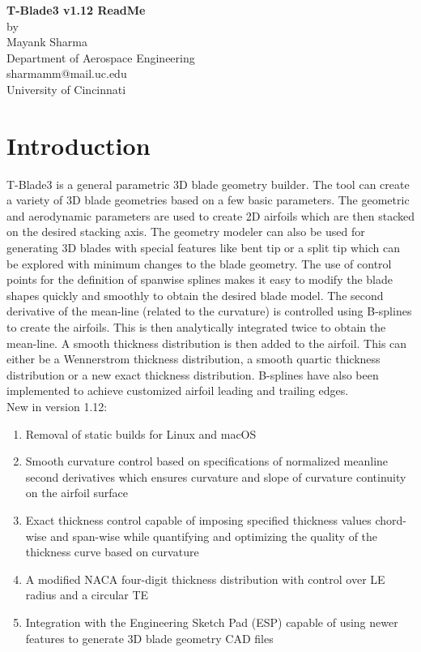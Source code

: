 \documentclass[8pt]{article}
\begin{document}
\begin{center}
\textbf{\large T-Blade3 v1.12 ReadMe}\\
by\\
Mayank Sharma\\
Department of Aerospace Engineering\\
sharmamm@mail.uc.edu\\
University of Cincinnati\\
[1cm]
\end{center}

\section{Introduction}
\noindent
T-Blade3 is a general parametric 3D blade geometry builder\cite{KiranPaper}. The tool can create a variety of 3D blade geometries based on a few basic parameters. The geometric and aerodynamic parameters are used to create 2D airfoils which are then stacked on the desired stacking axis\cite{KiranThesis}. The geometry modeler can also be  used for generating 3D blades with special features like bent tip or a split tip\cite{AbhayThesis} which can be explored with minimum changes to the blade geometry. The use of control points for the definition of spanwise splines makes it easy to modify the blade shapes quickly and smoothly to obtain the desired blade model\cite{SyedPaper}. The second derivative of the mean-line (related to the curvature) is controlled using B-splines to create the airfoils. This is then analytically integrated twice to obtain the mean-line\cite{AhmedPaper}. A smooth thickness distribution is then added to the airfoil. This can either be a Wennerstrom thickness distribution\cite{WennerstromBook}, a smooth quartic thickness distribution or a new exact thickness distribution\cite{KarthikThesis}. B-splines have also been implemented to achieve customized airfoil leading and trailing edges.\\

\noindent
New in version 1.12:

\begin{enumerate}[leftmargin=*]
    \item Removal of static builds for Linux and macOS
    \item Smooth curvature control based on specifications of normalized meanline second derivatives which ensures curvature and slope of curvature continuity on the airfoil surface
    \item Exact thickness control capable of imposing specified thickness values chord-wise and span-wise while quantifying and optimizing the quality of the thickness curve based on curvature
    \item A modified NACA four-digit thickness distribution\cite{AbbottText} with control over LE radius and a circular TE
    \item Integration with the Engineering Sketch Pad (ESP) capable of using newer features to generate 3D blade geometry CAD files
\end{enumerate}
\end{document}
